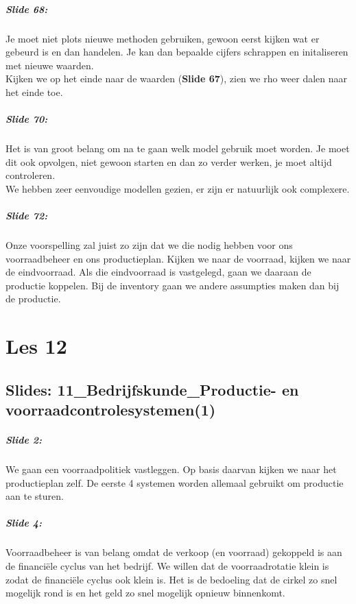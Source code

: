 \documentclass[10pt,a4paper]{report}
\begin{document}
\paragraph{Slide 68:} Je moet niet plots nieuwe methoden gebruiken, gewoon eerst kijken wat er gebeurd is en dan handelen. Je kan dan bepaalde cijfers schrappen en initaliseren met nieuwe waarden.\\
Kijken we op het einde naar de waarden (\textbf{Slide 67}), zien we rho weer dalen naar het einde toe.

\paragraph{Slide 70:} Het is van groot belang om na te gaan welk model gebruik moet worden. Je moet dit ook opvolgen, niet gewoon starten en dan zo verder werken, je moet altijd controleren.\\
We hebben zeer eenvoudige modellen gezien, er zijn er natuurlijk ook complexere. 

\paragraph{Slide 72:} Onze voorspelling zal juist zo zijn dat we die nodig hebben voor ons voorraadbeheer en ons productieplan. Kijken we naar de voorraad, kijken we naar de eindvoorraad. Als die eindvoorraad is vastgelegd, gaan we daaraan de productie koppelen. Bij de inventory gaan we andere assumpties maken dan bij de productie.

\chapter{Les 12}
\section{Slides: 11\_Bedrijfskunde\_Productie- en voorraadcontrolesystemen(1)}

\paragraph{Slide 2:} We gaan een voorraadpolitiek vastleggen. Op basis daarvan kijken we naar het productieplan zelf. De eerste 4 systemen worden allemaal gebruikt om productie aan te sturen. 

\paragraph{Slide 4:} Voorraadbeheer is van belang omdat de verkoop (en voorraad) gekoppeld is aan de financi\"ele cyclus van het bedrijf. We willen dat de voorraadrotatie klein is zodat de financi\"ele cyclus ook klein is. Het is de bedoeling dat de cirkel zo snel mogelijk rond is en het geld zo snel mogelijk opnieuw binnenkomt.
\end{document}
